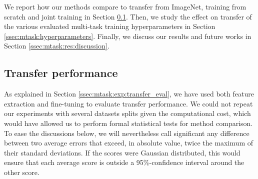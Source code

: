 We report how our methods compare to transfer from ImageNet, training from scratch and joint training in Section \ref{ssec:mtask:transfer_perfromance}. Then, we study the effect on transfer of the various evaluated multi-task training hyperparameters in Section \ref{ssec:mtask:hyperparameters}. Finally, we discuss our results and future works in Section \ref{ssec:mtask:res:discussion}.

\subsection{Transfer performance}
\label{ssec:mtask:transfer_perfromance}

As explained in Section \ref{ssec:mtask:exp:transfer_eval}, we have used both feature extraction and fine-tuning to evaluate transfer performance. We could not repeat our experiments with several datasets splits given the computational cost, which would have allowed us to perform formal statistical tests for method comparison. To ease the discussions below, we will nevertheless call significant any difference between two average errors that exceed, in absolute value, twice the maximum of their standard deviations. If the scores were Gaussian distributed, this would ensure that each average score is outside a 95\%-confidence interval around the other score.


